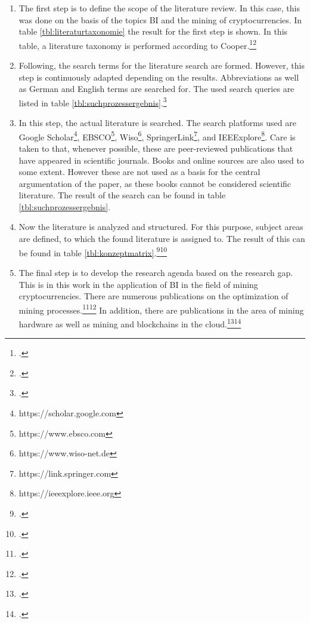 \begin{enumerate} 
    \item The first step is to define the scope of the literature review. In this case, this was done on the basis of the topics \ac{BI} and
    the mining of cryptocurrencies. In table \ref{tbl:literaturtaxonomie} the result for the first step is shown. In
    this table, a literature taxonomy is performed according to Cooper.\footcite[Cf.][p. 2212]{brocke2009reconstructing}\footcite[Cf.][]{cooper1988organizing} 
    \item Following, the search terms for the literature search are formed. However, this step is continuously adapted depending on
    the results. Abbreviations as well as German and English terms are searched for. The used 
    search queries are listed in table \ref{tbl:suchprozessergebnis}.\footcite[Cf.][pp. 2211]{brocke2009reconstructing} 
    \item In this step, the actual literature is searched. The search platforms used are Google
    Scholar\footnote{https://scholar.google.com}, EBSCO\footnote{https://www.ebsco.com}, Wiso\footnote{https://www.wiso-net.de}, 
    SpringerLink\footnote{https://link.springer.com}, and IEEExplore\footnote{https://ieeexplore.ieee.org}. Care is taken to
    that, whenever possible, these are peer-reviewed publications that have appeared in scientific journals.
    Books and online sources are also used to some extent. However these are not used as a basis for the central
    argumentation of the paper, as these books cannot be considered scientific literature. The result of the
    search can be found in table \ref{tbl:suchprozessergebnis}. 
    \item Now the literature is analyzed and structured. For this purpose, subject areas are defined, to which the found literature is assigned
    to. The result of this can be found in table \ref{tbl:konzeptmatrix}.\footcite[Cf.][p. 2214]{brocke2009reconstructing}\footcite[Cf.][]{webster2002analyzing}  
    \item The final step is to develop the research agenda based on the research gap. This is in this work in
    the application of \ac{BI} in the field of mining cryptocurrencies. There are numerous publications on the optimization of mining
    processes.\footcite[Cf.][]{han2019demystifying}\footcite[Cf.][]{courtois2014optimizing} In addition, there are publications in the
    area of mining hardware as well as mining and blockchains in the cloud.\footcite[Cf.][]{taylor2017evolution}\footcite[Cf.][]{gai2020blockchain} 

\end{enumerate}
